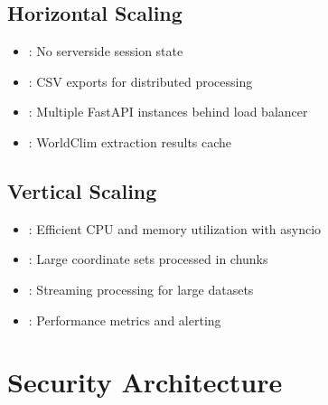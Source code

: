 \documentclass[letterpaper,10pt,english]{sphinxmanual}
\begin{document}
\subsection{Horizontal Scaling}
\label{\detokenize{architecture:horizontal-scaling}}\begin{itemize}
\item {} 
\sphinxAtStartPar
{}: No server\sphinxhyphen{}side session state

\item {} 
\sphinxAtStartPar
{}: CSV exports for distributed processing

\item {} 
\sphinxAtStartPar
{}: Multiple FastAPI instances behind load balancer

\item {} 
\sphinxAtStartPar
{}: WorldClim extraction results cache

\end{itemize}


\subsection{Vertical Scaling}
\label{\detokenize{architecture:vertical-scaling}}\begin{itemize}
\item {} 
\sphinxAtStartPar
{}: Efficient CPU and memory utilization with asyncio

\item {} 
\sphinxAtStartPar
{}: Large coordinate sets processed in chunks

\item {} 
\sphinxAtStartPar
{}: Streaming processing for large datasets

\item {} 
\sphinxAtStartPar
{}: Performance metrics and alerting

\end{itemize}


\section{Security Architecture}
\label{\detokenize{architecture:security-architecture}}
\end{document}
